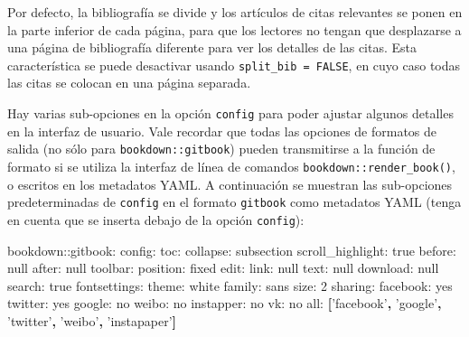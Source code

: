 \documentclass[12pt,]{krantz}
\makeatletter
\newenvironment{Shaded}{\begin{snugshade}}{\end{snugshade}}
\newcommand{\KeywordTok}[1]{\textcolor[rgb]{0.13,0.29,0.53}{\textbf{#1}}}
\newcommand{\DataTypeTok}[1]{\textcolor[rgb]{0.13,0.29,0.53}{#1}}
\newcommand{\StringTok}[1]{\textcolor[rgb]{0.31,0.60,0.02}{#1}}
\newcommand{\FunctionTok}[1]{\textcolor[rgb]{0.00,0.00,0.00}{#1}}
\newcommand{\AttributeTok}[1]{\textcolor[rgb]{0.77,0.63,0.00}{#1}}
\newenvironment{kframe}{%
\medskip{}
\setlength{\fboxsep}{.8em}
 \def\at@end@of@kframe{}%
 \ifinner\ifhmode%
  \def\at@end@of@kframe{\end{minipage}}%
  \begin{minipage}{\columnwidth}%
 \fi\fi%
 \def\FrameCommand##1{\hskip\@totalleftmargin \hskip-\fboxsep
 \colorbox{shadecolor}{##1}\hskip-\fboxsep
     \hskip-\linewidth \hskip-\@totalleftmargin \hskip\columnwidth}%
 \MakeFramed {\advance\hsize-\width
   \@totalleftmargin\z@ \linewidth\hsize
   \@setminipage}}%
 {\par\unskip\endMakeFramed%
 \at@end@of@kframe}
\renewenvironment{Shaded}{\begin{kframe}}{\end{kframe}}
\theoremstyle{definition}
\theoremstyle{definition}
\theoremstyle{definition}
\theoremstyle{remark}
\makeatother
\begin{document}
Por defecto, la bibliografía se divide y los artículos de citas
relevantes se ponen en la parte inferior de cada página, para que los
lectores no tengan que desplazarse a una página de bibliografía
diferente para ver los detalles de las citas. Esta característica se
puede desactivar usando \texttt{split\_bib\ =\ FALSE}, en cuyo caso
todas las citas se colocan en una página separada.

Hay varias sub-opciones en la opción \texttt{config} para poder ajustar
algunos detalles en la interfaz de usuario. Vale recordar que todas las
opciones de formatos de salida (no sólo para \texttt{bookdown::gitbook})
pueden transmitirse a la función de formato si se utiliza la interfaz de
línea de comandos \texttt{bookdown::render\_book()}, o escritos en los
metadatos YAML. A continuación se muestran las sub-opciones
predeterminadas de \texttt{config} en el formato \texttt{gitbook} como
metadatos YAML (tenga en cuenta que se inserta debajo de la opción
\texttt{config}):

\begin{Shaded}
\begin{Highlighting}[]
\FunctionTok{bookdown:}\AttributeTok{:gitbook:}
  \FunctionTok{config:}
    \FunctionTok{toc:}
      \FunctionTok{collapse:}\AttributeTok{ subsection}
      \FunctionTok{scroll_highlight:}\AttributeTok{ true}
      \FunctionTok{before:}\AttributeTok{ }\DataTypeTok{null}
      \FunctionTok{after:}\AttributeTok{ }\DataTypeTok{null}
    \FunctionTok{toolbar:}
      \FunctionTok{position:}\AttributeTok{ fixed}
    \FunctionTok{edit:}
      \FunctionTok{link:}\AttributeTok{ }\DataTypeTok{null}
      \FunctionTok{text:}\AttributeTok{ }\DataTypeTok{null}
    \FunctionTok{download:}\AttributeTok{ }\DataTypeTok{null}
    \FunctionTok{search:}\AttributeTok{ true}
    \FunctionTok{fontsettings:}
      \FunctionTok{theme:}\AttributeTok{ white}
      \FunctionTok{family:}\AttributeTok{ sans}
      \FunctionTok{size:}\AttributeTok{ 2}
    \FunctionTok{sharing:}
      \FunctionTok{facebook:}\AttributeTok{ yes}
      \FunctionTok{twitter:}\AttributeTok{ yes}
      \FunctionTok{google:}\AttributeTok{ no}
      \FunctionTok{weibo:}\AttributeTok{ no}
      \FunctionTok{instapper:}\AttributeTok{ no}
      \FunctionTok{vk:}\AttributeTok{ no}
      \FunctionTok{all:}\AttributeTok{ }\KeywordTok{[}\StringTok{'facebook'}\KeywordTok{,} \StringTok{'google'}\KeywordTok{,} \StringTok{'twitter'}\KeywordTok{,} \StringTok{'weibo'}\KeywordTok{,} \StringTok{'instapaper'}\KeywordTok{]}
\end{Highlighting}
\end{Shaded}
\end{document}
